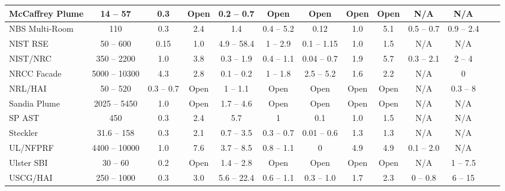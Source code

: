 \begin{table}
\begin{center}
\begin{tabular}{|l|c|c|c|c|c|c|c|c|c|c|c|c|}
McCaffrey Plume     & 14 -- 57      & 0.3           & Open  & 0.2 -- 0.7        & Open          & Open          & Open      & Open      & N/A               & N/A               \\ \hline
NBS Multi-Room      & 110           & 0.3           & 2.4   & 1.4               & 0.4 -- 5.2    & 0.12          & 1.0       & 5.1       & 0.5 -- 0.7        & 0.9 -- 2.4        \\ \hline
NIST RSE            & 50 -- 600     & 0.15          & 1.0   & 4.9 -- 58.4       & 1 -- 2.9      & 0.1 -- 1.15   & 1.0       & 1.5       & N/A               & N/A               \\ \hline
NIST/NRC            & 350 -- 2200   & 1.0           & 3.8   & 0.3 -- 1.9        & 0.4 -- 1.1    & 0.04 -- 0.7   & 1.9       & 5.7       & 0.3 -- 2.1        & 2 -- 4            \\ \hline
NRCC Facade         & 5000 -- 10300 & 4.3           & 2.8   & 0.1 -- 0.2        & 1 -- 1.8      & 2.5 -- 5.2    & 1.6       & 2.2       & N/A               & 0                 \\ \hline
NRL/HAI             & 50 -- 520     & 0.3 -- 0.7    & Open  & 1 -- 1.1          & Open          & Open          & Open      & Open      & N/A               & 0.3 -- 8          \\ \hline
Sandia Plume        & 2025 -- 5450  & 1.0           & Open  & 1.7 -- 4.6        & Open          & Open          & Open      & Open      & N/A               & N/A               \\ \hline
SP AST              & 450           & 0.3           & 2.4   & 5.7               & 1             & 0.1           & 1.0       & 1.5       & N/A               & N/A               \\ \hline
Steckler            & 31.6 -- 158   & 0.3           & 2.1   & 0.7 -- 3.5        & 0.3 -- 0.7    & 0.01 -- 0.6   & 1.3       & 1.3       & N/A               & N/A               \\ \hline
UL/NFPRF            & 4400 -- 10000 & 1.0           & 7.6   & 3.7 -- 8.5        & 0.8 -- 1.1    & 0             & 4.9       & 4.9       & 0.1 -- 2.0        & N/A               \\ \hline
Ulster SBI          & 30 -- 60      & 0.2           & Open  & 1.4 -- 2.8        & Open          & Open          & Open      & Open      & N/A               & 1 -- 7.5          \\ \hline
USCG/HAI            & 250 -- 1000   & 0.3           & 3.0   & 5.6 -- 22.4       & 0.6 -- 1.1    & 0.3 -- 1.0    & 1.7       & 2.3       & 0 -- 0.8          & 6 -- 15           \\ \hline

\end{tabular}
\end{center}
\end{table}
